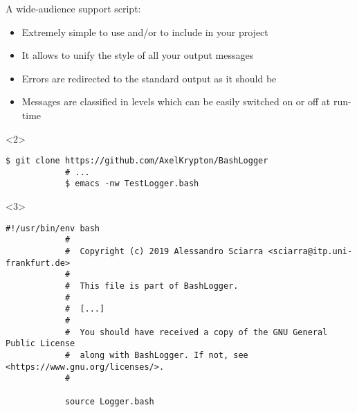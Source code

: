 \begin{frame}[fragile]{A wide-audience support script: }
    \vspace{-3mm}
    \begin{itemize}[<only@1-2,4->]
        \item Extremely simple to use and/or to include in your project
        \item It allows to unify the style of all your output messages
        \item Errors are redirected to the standard output as it should be
        \item Messages are classified in levels which can be easily switched on or off at run-time
    \end{itemize}
    \begin{onlyenv}<2>
        \begin{lstlisting}[style=myBash, aboveskip=3mm]
            $ git clone https://github.com/AxelKrypton/BashLogger
            # ...
            $ emacs -nw TestLogger.bash
        \end{lstlisting}
    \end{onlyenv}
    \begin{onlyenv}<3>
        \vspace{3mm}
        \begin{lstlisting}[style=myBash, numbers=none, style=smaller]
            #!/usr/bin/env bash
            #
            #  Copyright (c) 2019 Alessandro Sciarra <sciarra@itp.uni-frankfurt.de>
            #
            #  This file is part of BashLogger.
            #
            #  [...]
            #
            #  You should have received a copy of the GNU General Public License
            #  along with BashLogger. If not, see <https://www.gnu.org/licenses/>.
            #
            
            source Logger.bash
            

\end{lstlisting}
\end{onlyenv}
\end{frame}
